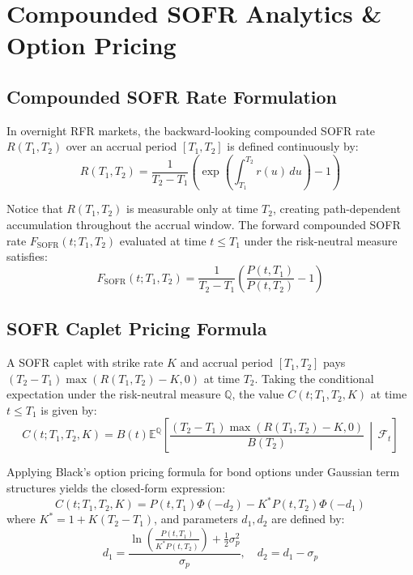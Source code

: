 \documentclass[11pt,a4paper]{article}
\begin{document}
\section{Compounded SOFR Analytics \& Option Pricing}

\subsection{Compounded SOFR Rate Formulation}

In overnight RFR markets, the backward-looking compounded SOFR rate $R(T_1, T_2)$ over an accrual period $[T_1, T_2]$ is defined continuously by:
\begin{equation}
R(T_1, T_2) = \frac{1}{T_2 - T_1} \left( \exp\left( \int_{T_1}^{T_2} r(u) \, du \right) - 1 \right)
\end{equation}

Notice that $R(T_1, T_2)$ is measurable only at time $T_2$, creating path-dependent accumulation throughout the accrual window. The forward compounded SOFR rate $F_{\text{SOFR}}(t; T_1, T_2)$ evaluated at time $t \le T_1$ under the risk-neutral measure satisfies:
\begin{equation}
F_{\text{SOFR}}(t; T_1, T_2) = \frac{1}{T_2 - T_1} \left( \frac{P(t, T_1)}{P(t, T_2)} - 1 \right)
\end{equation}

\subsection{SOFR Caplet Pricing Formula}

A SOFR caplet with strike rate $K$ and accrual period $[T_1, T_2]$ pays $(T_2 - T_1) \max(R(T_1, T_2) - K, 0)$ at time $T_2$. Taking the conditional expectation under the risk-neutral measure $\mathbb{Q}$, the value $C(t; T_1, T_2, K)$ at time $t \le T_1$ is given by:
\begin{equation}
C(t; T_1, T_2, K) = B(t) \mathbb{E}^{\mathbb{Q}} \left[ \frac{(T_2 - T_1) \max(R(T_1, T_2) - K, 0)}{B(T_2)} \, \middle|\, \mathcal{F}_t \right]
\end{equation}

Applying Black's option pricing formula for bond options under Gaussian term structures yields the closed-form expression:
\begin{equation}
C(t; T_1, T_2, K) = P(t, T_1) \Phi(-d_2) - K^* P(t, T_2) \Phi(-d_1)
\end{equation}
where $K^* = 1 + K(T_2 - T_1)$, and parameters $d_1, d_2$ are defined by:
\begin{equation}
d_1 = \frac{\ln\left(\frac{P(t, T_1)}{K^* P(t, T_2)}\right) + \frac{1}{2} \sigma_p^2}{\sigma_p}, \quad d_2 = d_1 - \sigma_p
\end{equation}
\end{document}
